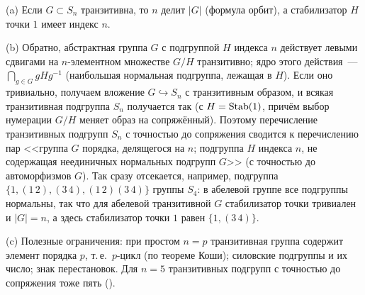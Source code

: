 \begin{remark}
(a) Если $G\subset S_n$ транзитивна, то $n$ делит $|G|$ (формула орбит), а стабилизатор $H$ точки $1$ имеет индекс $n$.

(b) Обратно, абстрактная группа $G$ с подгруппой $H$ индекса $n$ действует левыми сдвигами на $n$-элементном множестве
$G/H$ транзитивно; ядро этого действия~--- $\bigcap_{g\in G}gHg^{-1}$ (наибольшая нормальная подгруппа, лежащая в $H$). Если оно
тривиально, получаем вложение $G\hookrightarrow S_n$ с транзитивным образом, и всякая транзитивная подгруппа $S_n$ получается
так (с $H=\operatorname{Stab}(1)$, причём выбор нумерации $G/H$ меняет образ на сопряжённый). Поэтому перечисление транзитивных
подгрупп $S_n$ с точностью до сопряжения сводится к перечислению пар <<группа $G$ порядка, делящегося на $n$; подгруппа
$H$ индекса $n$, не содержащая неединичных нормальных подгрупп $G$>> (с точностью до автоморфизмов $G$). Так сразу
отсекается, например, подгруппа $\{1,(1\,2),(3\,4),(1\,2)(3\,4)\}$ группы $S_4$: в абелевой группе все подгруппы нормальны,
так что для абелевой транзитивной $G$ стабилизатор точки тривиален и $|G|=n$, а здесь стабилизатор точки $1$ равен
$\{1,(3\,4)\}$.

(c) Полезные ограничения: при простом $n=p$ транзитивная группа содержит элемент порядка $p$, т.\,е.\ $p$-цикл (по теореме
Коши); силовские подгруппы и их число; знак перестановок. Для $n=5$ транзитивных подгрупп с точностью до сопряжения
тоже пять ().


\end{remark}
